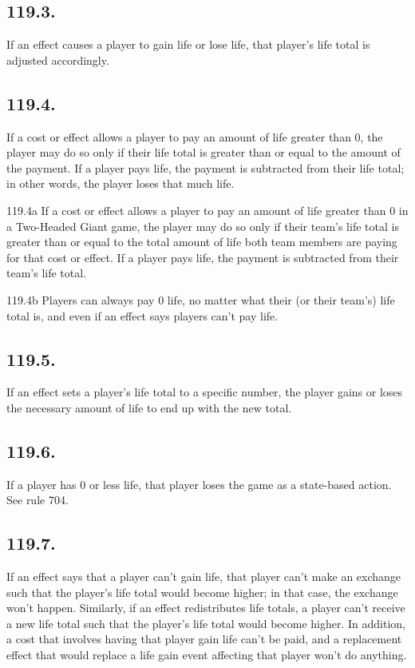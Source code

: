 \subsection*{119.3.}
If an effect causes a player to gain life or lose life, that player’s life total is adjusted accordingly.

\subsection*{119.4.}
If a cost or effect allows a player to pay an amount of life greater than 0, the player may do so only if their life total is greater than or equal to the amount of the payment. If a player pays life, the payment is subtracted from their life total; in other words, the player loses that much life.

119.4a If a cost or effect allows a player to pay an amount of life greater than 0 in a Two-Headed Giant game, the player may do so only if their team’s life total is greater than or equal to the total amount of life both team members are paying for that cost or effect. If a player pays life, the payment is subtracted from their team’s life total.

119.4b Players can always pay 0 life, no matter what their (or their team’s) life total is, and even if an effect says players can’t pay life.

\subsection*{119.5.}
If an effect sets a player’s life total to a specific number, the player gains or loses the necessary amount of life to end up with the new total.

\subsection*{119.6.}
If a player has 0 or less life, that player loses the game as a state-based action. See rule 704.

\subsection*{119.7.}
If an effect says that a player can’t gain life, that player can’t make an exchange such that the player’s life total would become higher; in that case, the exchange won’t happen. Similarly, if an effect redistributes life totals, a player can’t receive a new life total such that the player’s life total would become higher. In addition, a cost that involves having that player gain life can’t be paid, and a replacement effect that would replace a life gain event affecting that player won’t do anything.


